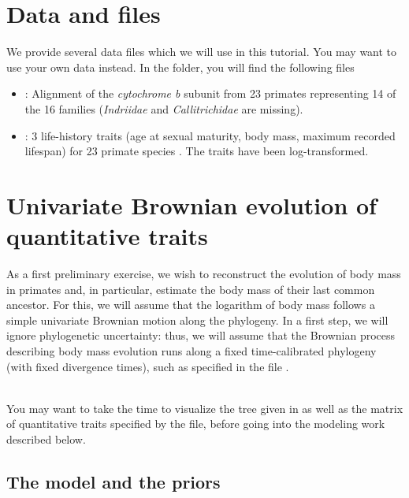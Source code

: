 \section{Data and files}

We provide several data files which we will use in this tutorial.
You may want to use your own data instead.
In the  folder, you will find the following files
\begin{itemize}
\item
{}: Alignment of the \textit{cytochrome b} subunit from 23 primates representing 14 of the 16 families (\textit{Indriidae} and \textit{Callitrichidae} are missing).

\item
{}: 3 life-history traits (age at sexual maturity, body mass, maximum recorded lifespan) for 23 primate species \citep[taken from the Anage database,][]{DeMagalhaes2009}. The traits have been log-transformed.
\end{itemize}





\section{Univariate Brownian evolution of quantitative traits}

\label{univariate}

As a first preliminary exercise, we wish to reconstruct the evolution of body mass in primates and, in particular, estimate the body mass of their last common ancestor.
For this, we will assume that the logarithm of body mass follows a simple univariate Brownian motion along the phylogeny.
In a first step, we will ignore phylogenetic uncertainty:
thus, we will assume that the Brownian process describing body mass evolution runs along a fixed time-calibrated phylogeny (with fixed divergence times), such as specified in the file .

\noindent \\ \impmark You may want to take the time to visualize the tree given in  as well as the matrix of quantitative traits specified by the  file, before going into the modeling work described below.

\subsection{The model and the priors}


